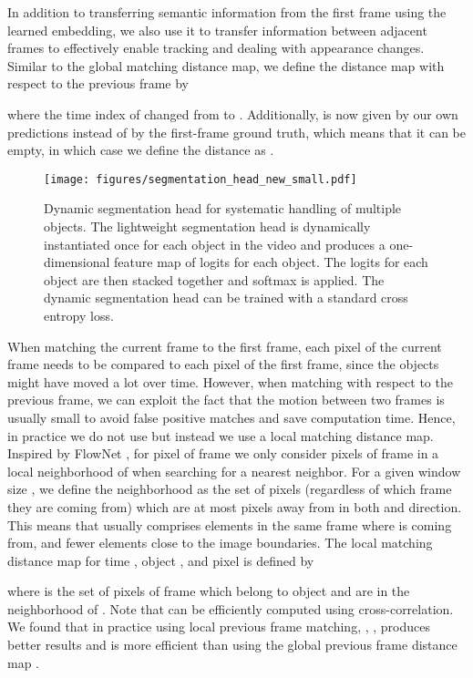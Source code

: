 \documentclass[10pt,twocolumn,letterpaper]{article}
\newcommand{\PAR}[1]{\vskip1pt \noindent {\bf #1~}}
\begin{document}
\PAR{Local Previous Frame Matching.}
In addition to transferring semantic information from the first frame using the learned embedding, we also use it to transfer information between adjacent frames to effectively enable tracking and dealing with appearance changes. Similar to the global matching distance map, we define the distance map  with respect to the previous frame by

where the time index of  changed from  to . Additionally,  is now given by our own predictions instead of by the first-frame ground truth, which means that it can be empty, in which case we define the distance as .

\begin{figure*}[t]
\centering
\texttt{[image: figures/segmentation\_head\_new\_small.pdf]}
\caption{\label{fig:seg_head} Dynamic segmentation head for systematic handling of multiple objects. The lightweight segmentation head is dynamically instantiated once for each object in the video and produces a one-dimensional feature map of logits for each object. The logits for each object are then stacked together and softmax is applied. The dynamic segmentation head can be trained with a standard cross entropy loss.}
\end{figure*}

When matching the current frame to the first frame, each pixel of the current frame needs to be compared to each pixel of the first frame, since the objects might have moved a lot over time. However, when matching with respect to the previous frame, we can exploit the fact that the motion between two frames is usually small to avoid false positive matches and save computation time. Hence, in practice we do not use  but instead we use a local matching distance map.
Inspired by FlowNet \cite{Dosovitskiy15ICCV}, for pixel  of frame  we only consider pixels  of frame  in a local neighborhood of  when searching for a nearest neighbor. For a given window size , we define the neighborhood  as the set of pixels (regardless of which frame they are coming from) which are at most  pixels away from  in both  and  direction. This means that  usually comprises  elements in the same frame where  is coming from, and fewer elements close to the image boundaries.
The local matching distance map  for time , object , and pixel  is defined by

where  is the set of pixels of frame  which belong to object  and are in the neighborhood of .
Note that  can be efficiently computed using cross-correlation. We found that in practice using local previous frame matching, \ie,  , produces better results and is more efficient than using the global previous frame distance map . 
\end{document}
